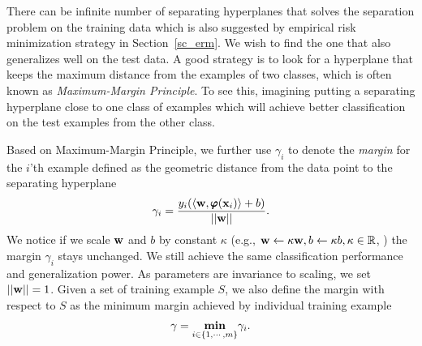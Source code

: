 {There can be infinite number of separating hyperplanes that solves the separation problem on the training data which is also suggested by empirical risk minimization strategy in Section~\ref{sc_erm}. 
We wish to find the one that also generalizes well on the test data.
A good strategy is to look for a hyperplane that keeps the maximum distance from the examples of two classes, which is often known as \textit{Maximum-Margin Principle}.
To see this, imagining putting a separating hyperplane close to one class of examples which will achieve better classification on the test examples from the other class.

Based on Maximum-Margin Principle, we further use $\gamma_i$ to denote the \textit{margin} for the $i$'th example defined as the geometric distance from the data point to the separating hyperplane
\begin{align*}
	\gamma_i = \frac{y_i(\langle \mathbf {w}, \pmb \varphi(\mathbf {x}_i) \rangle+b)}{\left|\left| \mathbf {w} \right|\right|}.
\end{align*}
We notice if we scale $\mathbf {w}$ and $b$ by constant $\kappa$ (e.g., $\mathbf {w}\leftarrow\kappa\mathbf {w}, b\leftarrow\kappa b, \kappa\in\mathbb{R}$, ) the margin $\gamma_i$ stays unchanged. 
We still achieve the same classification performance and generalization power.
As parameters are invariance to scaling, we set $\left|\left| \mathbf {w} \right|\right|=1$.
Given a set of training example $S$, we also define the margin with respect to $S$ as the minimum margin achieved by individual training example
\begin{align*}
	\gamma = \underset{i\in\{1,\cdots,m\}}{\textbf{min}}\gamma_i.
\end{align*}

}
